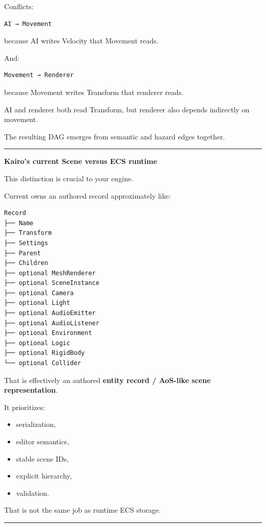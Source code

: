 Conflicts:

\begin{verbatim}
AI → Movement
\end{verbatim}

because AI writes Velocity that Movement reads.

And:

\begin{verbatim}
Movement → Renderer
\end{verbatim}

because Movement writes Transform that renderer reads.

AI and renderer both read Transform, but renderer also depends indirectly on movement.

The resulting DAG emerges from semantic and hazard edges together.

\begin{center}\rule{0.5\linewidth}{0.5pt}\end{center}

\textbf{Kairo's current Scene versus ECS runtime}

This distinction is crucial to your engine.

Current  owns an authored record approximately like:

\begin{verbatim}
Record
├── Name
├── Transform
├── Settings
├── Parent
├── Children
├── optional MeshRenderer
├── optional SceneInstance
├── optional Camera
├── optional Light
├── optional AudioEmitter
├── optional AudioListener
├── optional Environment
├── optional Logic
├── optional RigidBody
└── optional Collider
\end{verbatim}

That is effectively an authored \textbf{entity record / AoS-like scene representation}.

It prioritizes:

\begin{itemize}
\tightlist
\item
  serialization,
\item
  editor semantics,
\item
  stable scene IDs,
\item
  explicit hierarchy,
\item
  validation.
\end{itemize}

That is not the same job as runtime ECS storage.

\begin{center}\rule{0.5\linewidth}{0.5pt}\end{center}

